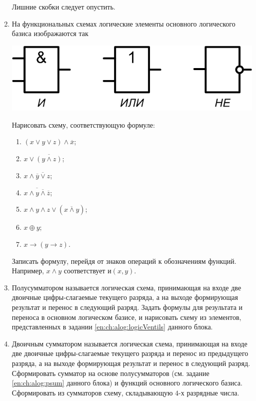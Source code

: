 \begin{enumerate}
    Лишние скобки следует опустить.

    \item\label{en:ch:alog:logicVentils} На функциональных схемах логические элементы основного логического базиса изображаются так
    \begin{center}
        \includegraphics[width=.5\textwidth]{fig/logicVentils}
    \end{center}
    
    Нарисовать схему, соответствующую формуле:
    \begin{enumerate}
        \item $(x\lor y\lor z)\land\overline{x}$;
        \item $x\lor\overline{(y\land z)}$;
        \item $x\land\overline{\overline{y}\lor z}$;
        \item $\overline{x\land\overline{y\land\overline{z}}}$;
        \item $x\land y\land z\lor(\overline{x\land y})$;
        \item $x\oplus y$;
        \item $x\to (y\to z)$.
    \end{enumerate}
    
    Записать формулу, перейдя от знаков операций к обозначениям функций. Например, $x\land y$ соответствует $\textit{и}(x,y)$.
    
    \item\label{en:ch:alog:psum} Полусумматором называется логическая схема, принимающая на входе две двоичные цифры-слагаемые текущего разряда, а на выходе формирующая результат и перенос в следующий разряд. Задать формулы для результата и переноса в основном логическом базисе, и нарисовать схему из элементов, представленных в задании \ref{en:ch:alog:logicVentils} данного блока.
    
    \item Двоичным сумматором называется логическая схема, принимающая на входе две двоичные цифры-слагаемые текущего разряда и перенос из предыдущего разряда, а на выходе формирующая результат и перенос в следующий разряд. Сформировать сумматор на основе полусумматоров (см. задание \ref{en:ch:alog:psum} данного блока) и функций основного логического базиса. Сформировать из сумматоров схему, складывающую $4$-х разрядные числа.
    
\end{enumerate}


